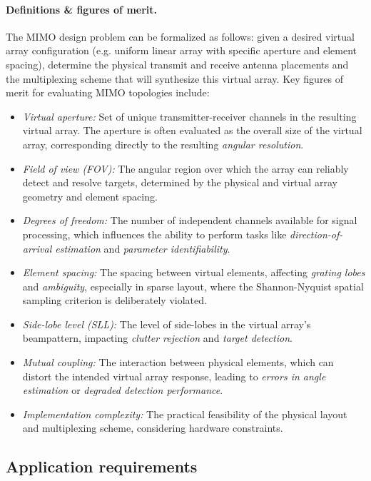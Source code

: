 \paragraph{Definitions \& figures of merit.}
The MIMO design problem can be formalized as follows: given a desired virtual array configuration (e.g. uniform linear array with specific aperture and element spacing), determine the physical transmit and receive antenna placements and the multiplexing scheme that will synthesize this virtual array.
Key figures of merit for evaluating MIMO topologies include:
\begin{itemize}
    \item \emph{Virtual aperture:} Set of unique transmitter-receiver channels in the resulting virtual array.
    The aperture is often evaluated as the overall size of the virtual array, corresponding directly to the resulting \emph{angular resolution}.
    \item \emph{Field of view (FOV):} The angular region over which the array can reliably detect and resolve targets, determined by the physical and virtual array geometry and element spacing.
    \item \emph{Degrees of freedom:} The number of independent channels available for signal processing, which influences the ability to perform tasks like \emph{direction-of-arrival estimation} and \emph{parameter identifiability}.
    \item \emph{Element spacing:} The spacing between virtual elements, affecting \emph{grating lobes} and \emph{ambiguity}, especially in sparse layout, where the Shannon-Nyquist spatial sampling criterion is deliberately violated.
    \item \emph{Side-lobe level (SLL):} The level of side-lobes in the virtual array's beampattern, impacting \emph{clutter rejection} and \emph{target detection}.
    \item \emph{Mutual coupling:} The interaction between physical elements, which can distort the intended virtual array response, leading to \emph{errors in angle estimation} or \emph{degraded detection performance}.
    \item \emph{Implementation complexity:} The practical feasibility of the physical layout and multiplexing scheme, considering hardware constraints.
\end{itemize}

\subsection{Application requirements}

